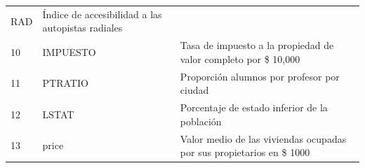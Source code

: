 \documentclass[11pt]{article}
\begin{document}
\begin{longtable}[]{@{}lll@{}}
\begin{minipage}[t]{0.14\columnwidth}
RAD\strut
\end{minipage} & \begin{minipage}[t]{0.20\columnwidth}\raggedright\strut
Índice de accesibilidad a las autopistas radiales\strut
\end{minipage}\tabularnewline
\begin{minipage}[t]{0.08\columnwidth}\raggedright\strut
10\strut
\end{minipage} & \begin{minipage}[t]{0.14\columnwidth}\raggedright\strut
IMPUESTO\strut
\end{minipage} & \begin{minipage}[t]{0.20\columnwidth}\raggedright\strut
Tasa de impuesto a la propiedad de valor completo por \$ 10,000\strut
\end{minipage}\tabularnewline
\begin{minipage}[t]{0.08\columnwidth}\raggedright\strut
11\strut
\end{minipage} & \begin{minipage}[t]{0.14\columnwidth}\raggedright\strut
PTRATIO\strut
\end{minipage} & \begin{minipage}[t]{0.20\columnwidth}\raggedright\strut
Proporción alumnos por profesor por ciudad\strut
\end{minipage}\tabularnewline
\begin{minipage}[t]{0.08\columnwidth}\raggedright\strut
12\strut
\end{minipage} & \begin{minipage}[t]{0.14\columnwidth}\raggedright\strut
LSTAT\strut
\end{minipage} & \begin{minipage}[t]{0.20\columnwidth}\raggedright\strut
Porcentaje de estado inferior de la población\strut
\end{minipage}\tabularnewline
\begin{minipage}[t]{0.08\columnwidth}\raggedright\strut
13\strut
\end{minipage} & \begin{minipage}[t]{0.14\columnwidth}\raggedright\strut
price\strut
\end{minipage} & \begin{minipage}[t]{0.20\columnwidth}\raggedright\strut
Valor medio de las viviendas ocupadas por sus propietarios en \$
1000\strut
\end{minipage}\tabularnewline
\bottomrule
\end{longtable}
\end{document}

